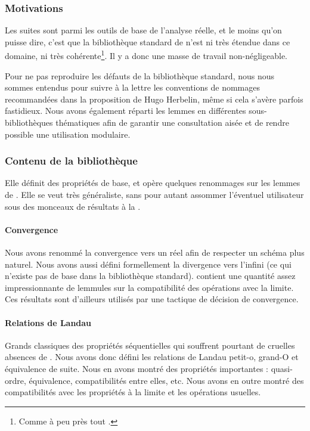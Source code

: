 \subsubsection{Motivations}

Les suites sont parmi les outils de base de l'analyse réelle, et le moins qu'on puisse dire, c'est que la bibliothèque standard de \coq n'est ni très étendue dans ce domaine, ni très cohérente\footnote{Comme à peu près tout .}. Il y a donc une masse de travail non-négligeable.

Pour ne pas reproduire les défauts de la bibliothèque standard, nous nous sommes entendus pour suivre à la lettre les conventions de nommages recommandées dans la proposition de Hugo Herbelin\cite{naming_conventions}, même si cela s'avère parfois fastidieux. Nous avons également réparti les lemmes en différentes sous-bibliothèques thématiques afin de garantir une consultation aisée et de rendre possible une utilisation modulaire.

\subsubsection{Contenu de la bibliothèque}

Elle définit des propriétés de base, et opère quelques renommages sur les lemmes de . Elle se veut très généraliste, sans pour autant assommer l'éventuel utilisateur sous des monceaux de résultats à la .

\paragraph{Convergence} Nous avons renommé la convergence vers un réel afin de respecter un schéma plus naturel. Nous avons aussi défini formellement la divergence vers l'infini (ce qui n'existe pas de base dans la bibliothèque standard).  contient une quantité assez impressionnante de lemmules sur la compatibilité des opérations avec la limite. Ces résultats sont d'ailleurs utilisés par une tactique de décision de convergence.

\paragraph{Relations de Landau} Grands classiques des propriétés séquentielles qui souffrent pourtant de cruelles absences de . Nous avons donc défini les relations de Landau petit-o, grand-O et équivalence de suite. Nous en avons montré des propriétés importantes : quasi-ordre, équivalence, compatibilités entre elles, etc. Nous avons en outre montré des compatibilités avec les propriétés à la limite et les opérations usuelles.

